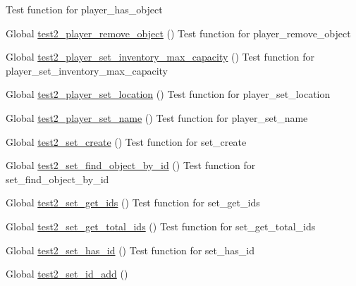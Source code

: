 \begin{DoxyRefList}
Test function for player\+\_\+has\+\_\+object  
\item[Global \mbox{\hyperlink{player__test_8h_af9e74e12ad6961761f1ff61afa56be3e}{test2\+\_\+player\+\_\+remove\+\_\+object}} ()]\label{test__test000069}%
%
Test function for player\+\_\+remove\+\_\+object  
\item[Global \mbox{\hyperlink{player__test_8h_a25f52636fb912ac120d40e17f70554fb}{test2\+\_\+player\+\_\+set\+\_\+inventory\+\_\+max\+\_\+capacity}} ()]\label{test__test000082}%
%
Test function for player\+\_\+set\+\_\+inventory\+\_\+max\+\_\+capacity  
\item[Global \mbox{\hyperlink{player__test_8h_a2c702753d9e2e3df9ef4abf2d1b9bc8d}{test2\+\_\+player\+\_\+set\+\_\+location}} ()]\label{test__test000072}%
%
Test function for player\+\_\+set\+\_\+location  
\item[Global \mbox{\hyperlink{player__test_8h_a6e7ce8ff791f4bf63749df647a44263f}{test2\+\_\+player\+\_\+set\+\_\+name}} ()]\label{test__test000056}%
%
Test function for player\+\_\+set\+\_\+name  
\item[Global \mbox{\hyperlink{set__test_8h_abed3d273788e23fc31ae7f5ed59277b9}{test2\+\_\+set\+\_\+create}} ()]\label{test__test000088}%
%
Test function for set\+\_\+create  
\item[Global \mbox{\hyperlink{set__test_8h_a5ab7b30d4a8ea609094642ab4b8608ee}{test2\+\_\+set\+\_\+find\+\_\+object\+\_\+by\+\_\+id}} ()]\label{test__test000107}%
%
Test function for set\+\_\+find\+\_\+object\+\_\+by\+\_\+id  
\item[Global \mbox{\hyperlink{set__test_8h_aafec36ceb79db74e67643606bf07c401}{test2\+\_\+set\+\_\+get\+\_\+ids}} ()]\label{test__test000121}%
%
Test function for set\+\_\+get\+\_\+ids  
\item[Global \mbox{\hyperlink{set__test_8h_a236ec2fe04b7272edab3005a73404830}{test2\+\_\+set\+\_\+get\+\_\+total\+\_\+ids}} ()]\label{test__test000101}%
%
Test function for set\+\_\+get\+\_\+total\+\_\+ids  
\item[Global \mbox{\hyperlink{set__test_8h_a27ba936110dfc23be0d0d3b9ebf07161}{test2\+\_\+set\+\_\+has\+\_\+id}} ()]\label{test__test000103}%
%
Test function for set\+\_\+has\+\_\+id  
\item[Global \mbox{\hyperlink{set__test_8h_ab6a9210f22d3234e027415888c419929}{test2\+\_\+set\+\_\+id\+\_\+add}} ()]\label{test__test000090}%

\end{DoxyRefList}
